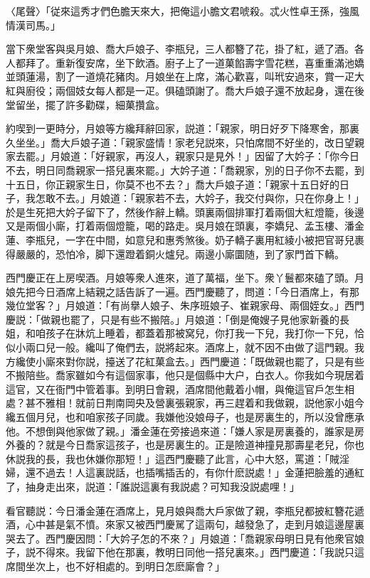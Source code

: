 〈尾聲〉「従來這秀才們色膽天來大，把俺這小膽文君唬殺。忒火性卓王孫，強風情漢司馬。」

當下衆堂客與吳月娘、喬大戶娘子、李瓶兒，三人都簪了花，掛了紅，遞了酒。各人都拜了。重新復安席，坐下飲酒。廚子上了一道菓餡壽字雪花糕，喜重重滿池嬌並頭蓮湯，割了一道燒花豬肉。月娘坐在上席，滿心歡喜，叫玳安過來，賞一疋大紅與廚役；兩個妓女每人都是一疋。俱磕頭謝了。喬大戶娘子還不放起身，還在後堂留坐，擺了許多勸碟，細菓攢盒。

約喫到一更時分，月娘等方纔拜辭回家，説道：「親家，明日好歹下降寒舍，那裏久坐坐。」喬大戶娘子道：「親家盛情！家老兒説來，只怕席間不好坐的，改日望親家去罷。」月娘道：「好親家，再沒人，親家只是見外！」因留了大妗子：「你今日不去，明日同喬親家一搭兒裏來罷。」大妗子道：「喬親家，別的日子你不去罷，到十五日，你正親家生日，你莫不也不去？」喬大戶娘子道：「親家十五日好的日子，我怎敢不去。」月娘道：「親家若不去，大妗子，我交付與你，只在你身上！」於是生死把大妗子留下了，然後作辭上轎。頭裏兩個排軍打着兩個大紅燈籠，後邊又是兩個小廝，打着兩個燈籠，喝的路走。吳月娘在頭裏，李嬌兒、孟玉樓、潘金蓮、李瓶兒，一字在中間，如意兒和惠秀煞後。奶子轎子裏用紅綾小被把官哥兒裹得嚴嚴的，恐怕冷，脚下還蹬着銅火爐兒。兩邊小廝圜随，到了家門首下轎。

西門慶正在上房喫酒。月娘等衆人進來，道了萬福，坐下。衆丫鬟都來磕了頭。月娘先把今日酒席上結親之話告訴了一遍。西門慶聽了，問道：「今日酒席上，有那幾位堂客？」月娘道：「有尚擧人娘子、朱序班娘子、崔親家母、兩個姪女。」西門慶説：「做親也罷了，只是有些不搬陪。」月娘道：「倒是俺嫂子見他家新養的長姐，和咱孩子在牀炕上睡着，都蓋着那被窝兒，你打我一下兒，我打你一下兒，恰似小兩口兒一般。纔叫了俺們去，説將起來。酒席上，就不因不由做了這門親。我方纔使小廝來對你説，擡送了花紅菓盒去。」西門慶道：「既做親也罷了，只是有些不搬陪些。喬家雖如今有這個家事，他只是個縣中大户，白衣人。你我如今現居着這官，又在衙門中管着事。到明日會親，酒席間他戴着小帽，與俺這官戶怎生相處？甚不雅相！就前日荆南岡央及營裏張親家，再三趕着和我做親，説他家小姐今纔五個月兒，也和咱家孩子同歲。我嫌他没娘母子，也是房裏生的，所以没曾應承他。不想倒與他家做了親。」潘金蓮在旁接過來道：「嫌人家是房裏養的，誰家是房外養的？就是今日喬家這孩子，也是房裏生的。正是險道神撞見那壽星老兒，你也休説我的長，我也休嫌你那短！」這西門慶聽了此言，心中大怒，罵道：「賊淫婦，還不過去！人這裏説話，也插嘴插舌的，有你什麽説處！」金蓮把臉羞的通紅了，抽身走出來，説道：「誰説這裏有我説處？可知我没説處哩！」

看官聽説：今日潘金蓮在酒席上，見月娘與喬大戶家做了親，李瓶兒都披紅簪花遞酒，心中甚是氣不憤。來家又被西門慶駡了這兩句，越發急了，走到月娘這邊屋裏哭去了。西門慶因問：「大妗子怎的不來？」月娘道：「喬親家母明日見有他衆官娘子，説不得來。我留下他在那裏，教明日同他一搭兒裏來。」西門慶道：「我説只這席間坐次上，也不好相處的。到明日怎麽廝會？」

